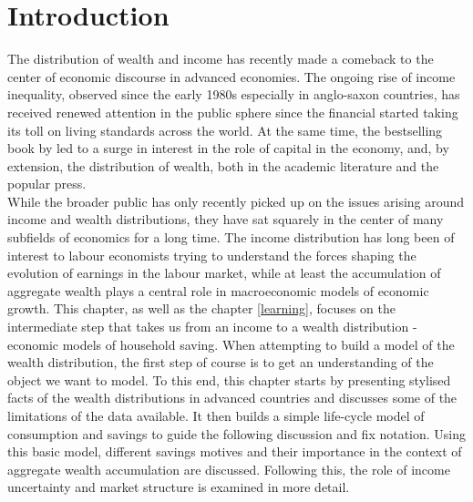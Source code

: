 \section{Introduction}

The distribution of wealth and income has recently made a comeback to the
center of economic discourse in advanced economies. The ongoing rise of
income inequality, observed since the early 1980s especially in anglo-saxon
countries, has received renewed attention in the public sphere since the
financial started taking its toll on living standards across the world. At
the same time, the bestselling book by \citet{Piketty2014} led to a surge
in interest in the role of capital in the economy, and, by extension, the
distribution of wealth, both in the academic literature and the popular
press. \\
While the broader public has only recently picked up on the issues arising
around income and wealth distributions, they have sat squarely in the center
of many subfields of economics for a long time. The income distribution has
long been of interest to labour economists trying to understand the forces
shaping the evolution of earnings in the labour market, while at least the
accumulation of aggregate wealth plays a central role in macroeconomic
models of economic growth. This chapter, as well as the chapter
\ref{learning}, focuses on the intermediate step that takes us from an
income to a wealth distribution - economic models of household saving.
When attempting to build a model of the wealth distribution, the first
step of course is to get an understanding of the object we want to model.
To this end, this chapter starts by presenting stylised facts of the wealth
distributions in advanced countries and discusses some of the limitations
of the data available. It then builds a simple life-cycle model of consumption
and savings to guide the following discussion and fix notation. Using this
basic model, different savings motives and their importance in the context
of aggregate wealth accumulation are discussed. Following this, the role of
income uncertainty and market structure is examined in more detail.


